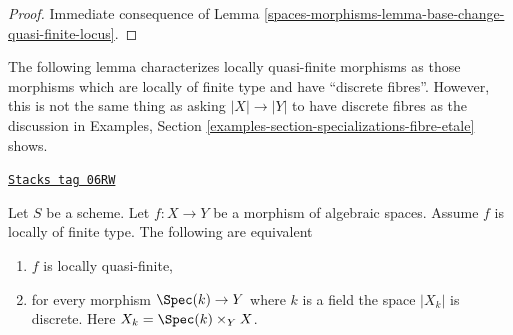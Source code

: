 \begin{proof}
Immediate consequence of Lemma \ref{spaces-morphisms-lemma-base-change-quasi-finite-locus}.
\end{proof}

The following lemma characterizes locally quasi-finite morphisms as those
morphisms which are locally of finite type and have ``discrete fibres''.
However, this is not the same thing as asking $|X| \to |Y|$ to have
discrete fibres as the discussion in
Examples, Section \ref{examples-section-specializations-fibre-etale}
shows.

\begin{lemma}
\label{spaces-morphisms-lemma-locally-quasi-finite}
\href{https://stacks.math.columbia.edu/tag/06RW}{\texttt{Stacks tag 06RW}}

Let $S$ be a scheme. Let $f : X \to Y$ be a morphism of algebraic spaces.
Assume $f$ is locally of finite type. The following are equivalent
\begin{enumerate}
\item $f$ is locally quasi-finite,
\item for every morphism $\Spec(k) \to Y$ where $k$ is a field
the space $|X_k|$ is discrete. Here $X_k = \Spec(k) \times_Y X$.
\end{enumerate}
\end{lemma}

